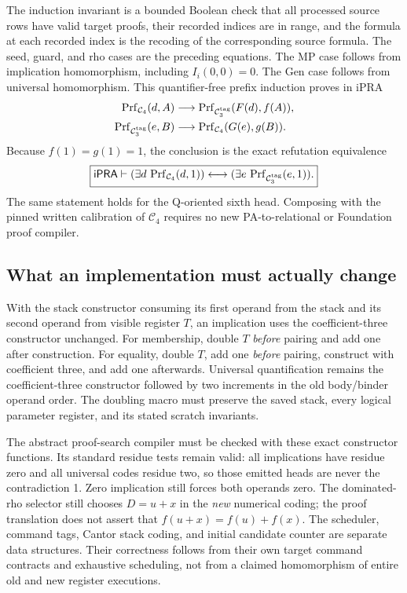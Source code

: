 The induction invariant is a bounded Boolean check that all processed
source rows have valid target proofs, their recorded indices are in range,
and the formula at each recorded index is the recoding of the corresponding
source formula.  The seed, guard, and rho cases are the preceding equations.
The MP case follows from implication homomorphism, including
$I_i(0,0)=0$.  The Gen case follows from universal homomorphism.  This
quantifier-free prefix induction proves in iPRA
\[
\begin{aligned}
 \operatorname{Prf}_{\mathcal C_4}(d,A)&\longrightarrow
       \operatorname{Prf}_{\mathcal C_3^{\rm tag}}(F(d),f(A)),\\
 \operatorname{Prf}_{\mathcal C_3^{\rm tag}}(e,B)&\longrightarrow
       \operatorname{Prf}_{\mathcal C_4}(G(e),g(B)).
\end{aligned}
\]
Because $f(1)=g(1)=1$, the conclusion is the exact refutation equivalence
\[
\boxed{\mathsf{iPRA}\vdash
 (\exists d\,\operatorname{Prf}_{\mathcal C_4}(d,1))
 \longleftrightarrow
 (\exists e\,\operatorname{Prf}_{\mathcal C_3^{\rm tag}}(e,1)).}
\]
The same statement holds for the Q-oriented sixth head.  Composing with
the pinned written calibration of $\mathcal C_4$ requires no new
PA-to-relational or Foundation proof compiler.

\subsection{What an implementation must actually change}

With the stack constructor consuming its first operand from the stack and
its second operand from visible register $T$, an implication uses the
coefficient-three constructor unchanged.  For membership, double $T$
\emph{before} pairing and add one after construction.  For equality,
double $T$, add one \emph{before} pairing, construct with coefficient
three, and add one afterwards.  Universal quantification remains the
coefficient-three constructor followed by two increments in the old
body/binder operand order.  The doubling macro must preserve the saved
stack, every logical parameter register, and its stated scratch invariants.

The abstract proof-search compiler must be checked with these exact
constructor functions.  Its standard residue tests remain valid: all
implications have residue zero and all universal codes residue two, so
those emitted heads are never the contradiction 1.  Zero implication
still forces both operands zero.  The dominated-rho selector still
chooses $D=u+x$ in the \emph{new} numerical coding; the proof translation
does not assert that $f(u+x)=f(u)+f(x)$.  The scheduler, command tags,
Cantor stack coding, and initial candidate counter are separate data
structures.  Their correctness follows from their own target command
contracts and exhaustive scheduling, not from a claimed homomorphism
of entire old and new register executions.

